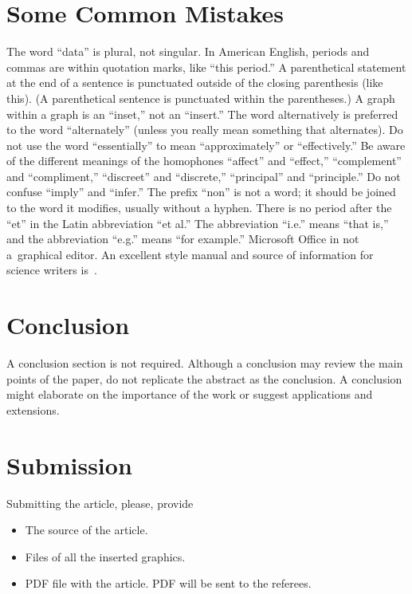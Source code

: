 \documentclass[conference]{IEEEtran}
\theoremstyle{definition}
\begin{document}
\balance



\section{Some Common Mistakes}
The word ``data'' is plural, not singular.  In American English, periods and commas are within quotation marks, like ``this period.''  A parenthetical statement at the end of a sentence is punctuated outside of the closing parenthesis (like this).  (A parenthetical sentence is punctuated within the parentheses.)  A graph within a graph is an ``inset,'' not an ``insert.''  The word alternatively is preferred to the word ``alternately'' (unless you really mean something that alternates).  Do not use the word ``essentially'' to mean ``approximately'' or ``effectively.''  Be aware of the different meanings of the homophones ``affect'' and ``effect,'' ``complement'' and ``compliment,'' ``discreet'' and ``discrete,'' ``principal'' and ``principle.''  Do not confuse ``imply'' and ``infer.''  The prefix ``non'' is not a word; it should be joined to the word it modifies, usually without a hyphen.  There is no period after the ``et'' in the Latin abbreviation ``et al.''  The abbreviation ``i.e.'' means ``that is,'' 
and the abbreviation ``e.g.'' means ``for example.'' Microsoft Office in not a~graphical editor. An excellent style manual and source of information for science writers is~\cite{c7}.

\section{Conclusion}
A conclusion section is not required. Although a conclusion may review the main points of the paper, do not replicate the abstract as the conclusion. A conclusion might elaborate on the importance of the work or suggest applications and extensions. 

\section{Submission}
Submitting the article, please, provide
\begin{itemize}
\item The source of the article.
\item Files of all the inserted graphics.
\item PDF file with the article. PDF will be sent to the referees.
\end{itemize}
\end{document}
